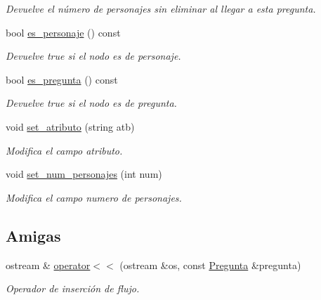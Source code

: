 \begin{DoxyCompactItemize}
\begin{DoxyCompactList}\small\item\em Devuelve el número de personajes sin eliminar al llegar a esta pregunta. \end{DoxyCompactList}\item 
bool \hyperlink{classPregunta_a034eab752003dd0d79d8c7227f79ce15}{es\+\_\+personaje} () const \hypertarget{classPregunta_a034eab752003dd0d79d8c7227f79ce15}{}\label{classPregunta_a034eab752003dd0d79d8c7227f79ce15}

\begin{DoxyCompactList}\small\item\em Devuelve true si el nodo es de personaje. \end{DoxyCompactList}\item 
bool \hyperlink{classPregunta_a6a79daf2b504199417b4ae900caabc96}{es\+\_\+pregunta} () const \hypertarget{classPregunta_a6a79daf2b504199417b4ae900caabc96}{}\label{classPregunta_a6a79daf2b504199417b4ae900caabc96}

\begin{DoxyCompactList}\small\item\em Devuelve true si el nodo es de pregunta. \end{DoxyCompactList}\item 
void \hyperlink{classPregunta_adbe4afe5c5f4ef5674be6f66f3d0d30a}{set\+\_\+atributo} (string atb)\hypertarget{classPregunta_adbe4afe5c5f4ef5674be6f66f3d0d30a}{}\label{classPregunta_adbe4afe5c5f4ef5674be6f66f3d0d30a}

\begin{DoxyCompactList}\small\item\em Modifica el campo atributo. \end{DoxyCompactList}\item 
void \hyperlink{classPregunta_a3c4abc1cff07c3e40dce2b6065ed2759}{set\+\_\+num\+\_\+personajes} (int num)\hypertarget{classPregunta_a3c4abc1cff07c3e40dce2b6065ed2759}{}\label{classPregunta_a3c4abc1cff07c3e40dce2b6065ed2759}

\begin{DoxyCompactList}\small\item\em Modifica el campo numero de personajes. \end{DoxyCompactList}\end{DoxyCompactItemize}
\subsection*{Amigas}
\begin{DoxyCompactItemize}
\item 
ostream \& \hyperlink{classPregunta_a32cc45df44752f792d258d26e3c80b0f}{operator$<$$<$} (ostream \&os, const \hyperlink{classPregunta}{Pregunta} \&pregunta)
\begin{DoxyCompactList}\small\item\em Operador de inserción de flujo. \end{DoxyCompactList}\end{DoxyCompactItemize}


